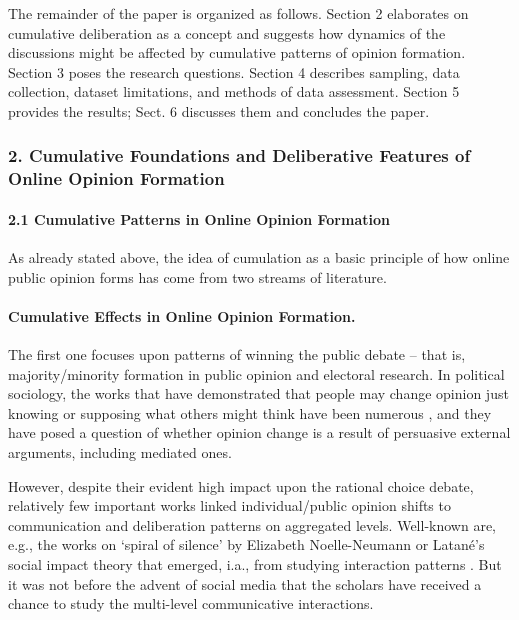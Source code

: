 The remainder of the paper is organized as follows. Section 2 elaborates on cumulative deliberation as a concept and suggests how dynamics of the discussions might be affected by cumulative patterns of opinion formation. Section 3 poses the research questions. Section 4 describes sampling, data collection, dataset limitations, and methods of data assessment. Section 5 provides the results; Sect. 6 discusses them and concludes the paper.

\subsubsection{2. Cumulative Foundations and Deliberative Features of Online Opinion Formation}

\paragraph{2.1 Cumulative Patterns in Online Opinion Formation}
As already stated above, the idea of cumulation as a basic principle of how online public opinion forms has come from two streams of literature.

\paragraph{Cumulative Effects in Online Opinion Formation.} The first one focuses upon patterns	of winning the public debate -- that is, majority/minority formation in public opinion and electoral research. In political sociology, the works that have demonstrated that people may change opinion just knowing or supposing what others might think have been numerous \cite{NowakSzamrejLatane}, and they have posed a question of whether opinion change is a result of persuasive external arguments, including mediated ones.

However, despite their evident high impact upon the rational choice debate, relatively few important works linked individual/public opinion shifts to communication and deliberation patterns on aggregated levels. Well-known are, e.g., the works on ‘spiral of silence’ by Elizabeth Noelle-Neumann \cite{NoelleNeuman1974} or Latané’s social impact theory that emerged, i.a., from studying interaction patterns \cite{NowakSzamrejLatane,Latane}. But it was not before the advent of social media that the scholars have received a chance to study the multi-level communicative interactions.

